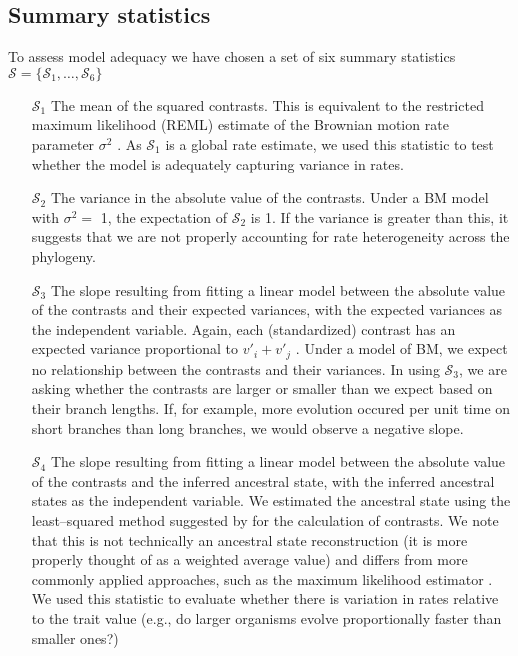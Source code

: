 \documentclass[a4paper,12pt]{article}
\begin{document}
\subsection*{Summary statistics}

To assess model adequacy we have chosen a set of six summary statistics $\mathcal{S} = \lbrace \mathcal{S}_1, \ldots, \mathcal{S}_6 \rbrace$

\begin{enumerate}
\item[$\mathcal{S}_1$] The mean of the squared contrasts. This is equivalent to the restricted maximum likelihood (REML) estimate of the Brownian motion rate parameter $\sigma^2$ \citep{Garland1992, Rohlf2001}. As $\mathcal{S}_1$ is a global rate estimate, we used this statistic to test whether the model is adequately capturing variance in rates.

\item[$\mathcal{S}_2$] The variance in the absolute value of the contrasts. Under a BM model with $\sigma^2 =$ 1, the expectation of $\mathcal{S}_2$ is 1. If the variance is greater than this, it suggests that we are not properly accounting for rate heterogeneity across the phylogeny.

\item[$\mathcal{S}_3$] The slope resulting from fitting a linear model between the absolute value of the contrasts and their expected variances, with the expected variances as the independent variable. Again, each (standardized) contrast has an expected variance proportional to $v\prime_i + v\prime_j$  \citep{Felsenstein1985}. Under a model of BM, we expect no relationship between the contrasts and their variances. In using $\mathcal{S}_3$, we are asking whether the contrasts are larger or smaller than we expect based on their branch lengths. If, for example, more evolution occured per unit time on short branches than long branches, we would observe a negative slope.

\item[$\mathcal{S}_4$] The slope resulting from fitting a linear model between the absolute value of the contrasts and the inferred ancestral state, with the inferred ancestral states as the independent variable. We estimated the ancestral state using the least--squared method suggested by \citep{Felsenstein1985} for the calculation of contrasts. We note that this is not technically an ancestral state reconstruction (it is more properly thought of as a weighted average value) and differs from more commonly applied approaches, such as the  maximum likelihood estimator \citep{Schluter1997}. We used this statistic to evaluate whether there is variation in rates relative to the trait value (e.g., do larger organisms evolve proportionally faster than smaller ones?)


\end{enumerate}
\end{document}

